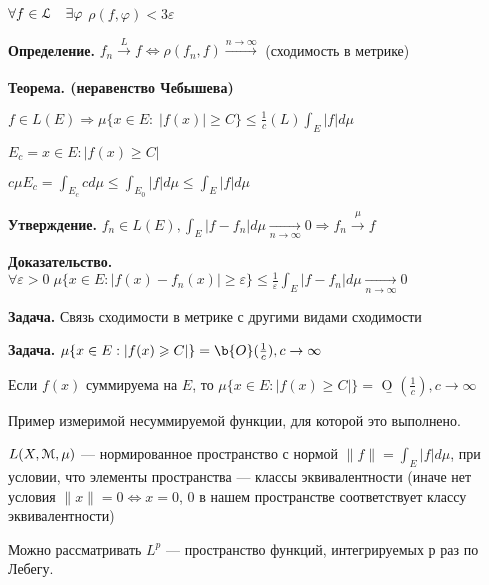$\forall f \in \EuScript{L} \quad \exists \varphi$ $\rho(f,
\varphi) < 3\varepsilon$


\textbf{Определение.} \quad $f_n \xrightarrow[]{L} f
\Leftrightarrow \rho(f_n, f) \xrightarrow[]{n \rightarrow \infty}$
(сходимость в метрике)

%
%
%
%
%
%
%
%
%
%
%
%



\textbf{Теорема. (неравенство Чебышева)} \quad

$f \in L(E) \Rightarrow \mu \{x \in E: \; |f(x)|  \geqslant C\}
\leqslant \frac{1}{c} (L) \int_E |f| d \mu$

$E_c = {x \in E: |f(x) \geqslant C|}$

$c \mu E_c = \int_{E_c} c d\mu \leqslant \int_{E_0} |f| d \mu
\leqslant \int_E |f| d\mu$

\textbf{Утверждение.} \quad $f_n \in L(E), \int_E |f - f_n| d \mu
\xrightarrow[n \rightarrow \infty]{} 0 \Rightarrow f_n
\xrightarrow[]{\mu} f$

\textbf{Доказательство.} \quad $\forall \varepsilon > 0 \;
\mu\{x\in E: |f(x) - f_n(x)| \geqslant \varepsilon\} \leqslant
\frac{1}{\varepsilon} \int_E |f- f_n|d\mu \xrightarrow[n
\rightarrow \infty]{} 0$

\textbf{Задача.} \quad Связь сходимости в метрике с другими видами
сходимости

\textbf{Задача.} \quad $\mu \{x \in E: |f(x) \geqslant C|\} =
\b{O}(\frac{1}{c}), c \rightarrow \infty$

Если $f(x)$ суммируема на $E$, то $\mu \{x \in E: |f(x) \geqslant
C|\} = $ \b{O} $ (\frac{1}{c}), c \rightarrow \infty$

Пример измеримой несуммируемой функции, для которой это выполнено.


$L(X, \EuScript{M}, \mu)$ --- нормированное пространство с нормой
$\|f\| = \int_E |f| d\mu$, при условии, что элементы пространства
--- классы эквивалентности (иначе нет условия $\|x\| = 0 \Leftrightarrow x =
0$, 0 в нашем пространстве соответствует классу
эквивалентности)

Можно рассматривать $L^p$ --- пространство функций, интегрируемых
р раз по Лебегу.

